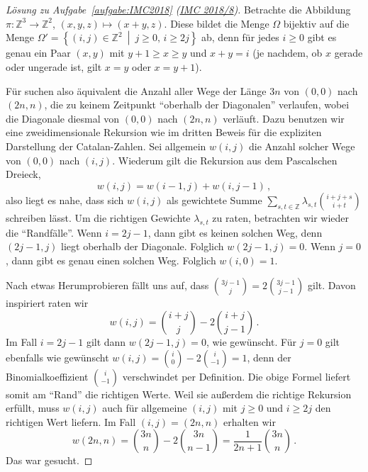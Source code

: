 \begin{proof}[Lösung zu Aufgabe~\ref{aufgabe:IMC2018} \textmd{(\href{https://imc-math.org.uk/?year=2018&section=problems&item=prob8q}{IMC 2018/8})}]
	Betrachte die Abbildung $\pi\colon \mathbb Z^3\rightarrow \mathbb Z^2$, $(x,y,z)\mapsto (x+y,z)$. Diese bildet die Menge $\Omega$ bijektiv auf die Menge $\Omega'=\left\{(i,j)\in \mathbb Z^2\ \middle|\ j\geqslant 0,\,i\geqslant 2j\right\}$ ab, denn für jedes $i\geqslant 0$ gibt es genau ein Paar $(x,y)$ mit $y+1\geqslant x\geqslant y$ und $x+y=i$ (je nachdem, ob $x$ gerade oder ungerade ist, gilt $x=y$ oder $x=y+1$).
	
	Für suchen also äquivalent die Anzahl aller Wege der Länge $3n$ von $(0,0)$ nach $(2n,n)$, die zu keinem Zeitpunkt \enquote{oberhalb der Diagonalen} verlaufen, wobei die Diagonale diesmal von $(0,0)$ nach $(2n,n)$ verläuft. Dazu benutzen wir eine zweidimensionale Rekursion wie im dritten Beweis für die expliziten Darstellung der Catalan-Zahlen. Sei allgemein $w(i,j)$ die Anzahl solcher Wege von $(0,0)$ nach $(i,j)$. Wiederum gilt die Rekursion aus dem Pascalschen Dreieck,
	\begin{equation*}
		w(i,j)=w(i-1,j)+w(i,j-1)\,,
	\end{equation*}
	also liegt es nahe, dass sich $w(i,j)$ als gewichtete Summe $\sum_{s,t\in\mathbb Z}\lambda_{s,t}\binom{i+j+s}{i+t}$ schreiben lässt. Um die richtigen Gewichte $\lambda_{s,t}$ zu raten, betrachten wir wieder die \enquote{Randfälle}. Wenn $i=2j-1$, dann gibt es keinen solchen Weg, denn $(2j-1,j)$ liegt oberhalb der Diagonale. Folglich $w(2j-1,j)=0$. Wenn $j=0$, dann gibt es genau einen solchen Weg. Folglich $w(i,0)=1$.
	
	Nach etwas Herumprobieren fällt uns auf, dass $\binom{3j-1}{j}=2\binom{3j-1}{j-1}$ gilt. Davon inspiriert raten wir
	\begin{equation*}
		w(i,j)=\binom{i+j}{j}-2\binom{i+j}{j-1}\,.
	\end{equation*}
	Im Fall $i=2j-1$ gilt dann $w(2j-1,j)=0$, wie gewünscht. Für $j=0$ gilt ebenfalls wie gewünscht $w(i,j)=\binom{i}{0}-2\binom{i}{-1}=1$, denn der Binomialkoeffizient $\binom{i}{-1}$ verschwindet per Definition. Die obige Formel liefert somit am \enquote{Rand} die richtigen Werte. Weil sie außerdem die richtige Rekursion erfüllt, muss $w(i,j)$ auch für allgemeine $(i,j)$ mit $j\geqslant 0$ und $i\geqslant 2j$ den richtigen Wert liefern. Im Fall $(i,j)=(2n,n)$ erhalten wir
	\begin{equation*}
		w(2n,n)=\binom{3n}{n}-2\binom{3n}{n-1}=\frac{1}{2n+1}\binom{3n}{n}\,.
	\end{equation*}
	Das war gesucht.
\end{proof}